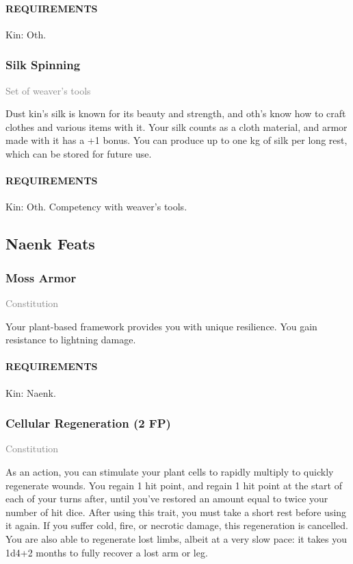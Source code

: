     \paragraph{REQUIREMENTS} Kin: Oth.

    \subsubsection{Silk Spinning} \label{feat::silkspinning}
    \small{\textcolor{gray}{Set of weaver's tools}}

    \normalsize
    Dust kin's silk is known for its beauty and strength, and oth's know how to craft clothes and various items with it.
    Your silk counts as a cloth material, and armor made with it has a +1 bonus.
    You can produce up to one kg of silk per long rest, which can be stored for future use.
    \paragraph{REQUIREMENTS} Kin: Oth. Competency with weaver's tools.

\subsection*{Naenk Feats}
    \subsubsection{Moss Armor} \label{feat::mossarmor}
    \small{\textcolor{gray}{Constitution}}

    \normalsize
    Your plant-based framework provides you with unique resilience.
    You gain resistance to lightning damage.
    \paragraph{REQUIREMENTS} Kin: Naenk.

    \subsubsection{Cellular Regeneration (2 FP)} \label{feat::cellularregeneration}
    \small{\textcolor{gray}{Constitution}}

    \normalsize
    As an action, you can stimulate your plant cells to rapidly multiply to quickly regenerate wounds.
    You regain 1 hit point, and regain 1 hit point at the start of each of your turns after, until you've restored an amount equal to twice your number of hit dice.
    After using this trait, you must take a short rest before using it again.
    If you suffer cold, fire, or necrotic damage, this regeneration is cancelled.
    You are also able to regenerate lost limbs, albeit at a very slow pace: it takes you 1d4+2 months to fully recover a lost arm or leg.
